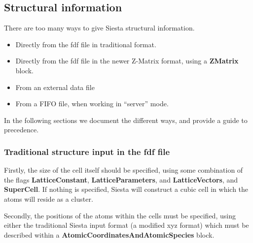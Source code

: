 \documentclass[11pt]{article}
\begin{document}
\vspace{5pt}
\subsection{Structural information}

There are too many ways to give {\sc Siesta} structural information.

\begin{itemize}
\item Directly from the fdf file in traditional format.
\item Directly from the fdf file in the newer Z-Matrix format, using 
a \textbf{ZMatrix} block.
\item From an external data file
\item From a FIFO file, when working in ``server'' mode.
\end{itemize}

In the following sections we document the different ways, and provide
a guide to precedence.

\subsubsection{Traditional structure input in the fdf file}

Firstly, the size of the cell itself should be specified, using
some combination of the flags
\textbf{LatticeConstant}, \textbf{LatticeParameters},
and \textbf{LatticeVectors}, and \textbf{SuperCell}.
If nothing is specified, {\sc Siesta} will construct a cubic
cell in which the atoms will reside as a cluster.

Secondly, the positions of the atoms within the cells
must be specified, using either the traditional {\sc Siesta}
input format (a modified xyz format) which must be described 
within
a \textbf{AtomicCoordinatesAndAtomicSpecies} block. 
\end{document}

